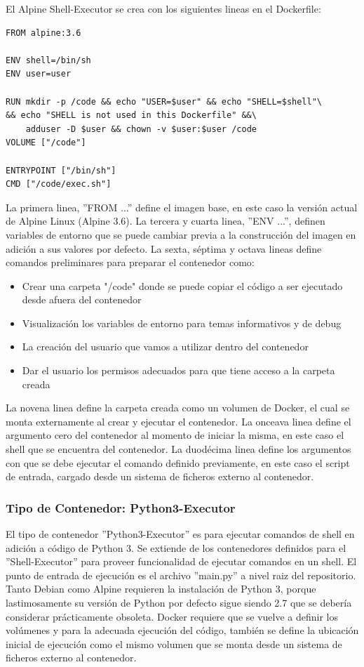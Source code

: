 El Alpine Shell-Executor se crea con los siguientes lineas en el Dockerfile: 
\begin{lstlisting}
FROM alpine:3.6

ENV shell=/bin/sh
ENV user=user

RUN mkdir -p /code && echo "USER=$user" && echo "SHELL=$shell"\
&& echo "SHELL is not used in this Dockerfile" &&\
    adduser -D $user && chown -v $user:$user /code
VOLUME ["/code"]

ENTRYPOINT ["/bin/sh"]
CMD ["/code/exec.sh"]
\end{lstlisting}
La primera linea, ''FROM ...'' define el imagen base, en este caso la versión actual de Alpine Linux (Alpine 3.6). La tercera y cuarta linea, ''ENV ...'', definen variables de entorno que se puede cambiar previa a la construcción del imagen en adición a sus valores por defecto. La sexta, séptima y octava lineas define comandos preliminares para preparar el contenedor como:
\begin{itemize}
	\item Crear una carpeta "/code" donde se puede copiar el código a ser ejecutado desde afuera del contenedor
	\item Visualización los variables de entorno para temas informativos y de debug
	\item La creación del usuario que vamos a utilizar dentro del contenedor
	\item Dar el usuario los permisos adecuados para que tiene acceso a la carpeta creada
\end{itemize}
La novena linea define la carpeta creada como un volumen de Docker, el cual se monta externamente al crear y ejecutar el contenedor. La onceava linea define el argumento cero del contenedor al momento de iniciar la misma, en este caso el shell que se encuentra del contenedor. La duodécima linea define los argumentos con que se debe ejecutar el comando definido previamente, en este caso el script de entrada, cargado desde un sistema de ficheros externo al contenedor.

\subsubsection{Tipo de Contenedor: Python3-Executor}
El tipo de contenedor ''Python3-Executor'' es para ejecutar comandos de shell en adición a código de Python 3. Se extiende de los contenedores definidos para el ''Shell-Executor'' para proveer funcionalidad de ejecutar comandos en un shell. El punto de entrada de ejecución es el archivo ''main.py'' a nivel raiz del repositorio. Tanto Debian como Alpine requieren la instalación de Python 3, porque lastimosamente su versión de Python por defecto sigue siendo 2.7 que se debería considerar prácticamente obsoleta. Docker requiere que se vuelve a definir los volúmenes y para la adecuada ejecución del código, también se define la ubicación inicial de ejecución como el mismo volumen que se monta desde un sistema de ficheros externo al contenedor.

